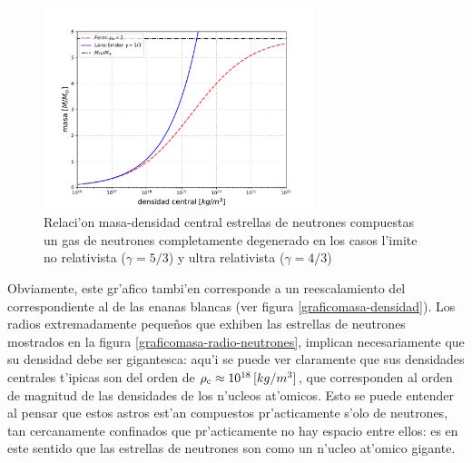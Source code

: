 \begin{figure}[H]
\centering
\includegraphics[angle=0,width=0.7\textwidth]{fig/fig-fermineutron-masa-densidad.pdf}
\caption{Relaci'on masa-densidad central estrellas de neutrones compuestas un gas de neutrones completamente degenerado en los casos l'imite no relativista ($\gamma=5/3$) y ultra relativista ($\gamma=4/3$)}\label{graficomasa-densidad-neutrones}
\end{figure}

Obviamente, este gr'afico tambi'en corresponde a un reescalamiento del correspondiente al de las enanas blancas (ver figura \ref{graficomasa-densidad}). Los radios extremadamente peque\~nos que exhiben las estrellas de neutrones mostrados en la figura \ref{graficomasa-radio-neutrones}, implican necesariamente que su densidad debe ser gigantesca: aqu'i se puede ver claramente que sus densidades centrales t'ipicas son del orden de $\rho_{\rm c}\approx10^{18}\,[kg/m^3]$, que corresponden al orden de magnitud de las densidades de los n'ucleos at'omicos. Esto se puede entender al pensar que estos astros est'an compuestos pr'acticamente s'olo de neutrones, tan cercanamente confinados que pr'acticamente no hay espacio entre ellos: es en este sentido que las estrellas de neutrones son como un n'ucleo at'omico gigante.


